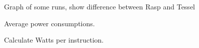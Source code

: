 
 

 

 


Graph of some runs, show difference between Rasp and Tessel


Average power consumptions.

Calculate Watts per instruction.